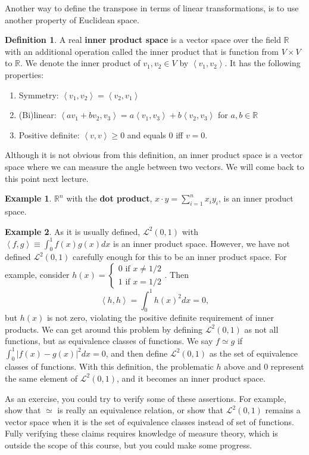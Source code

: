 \documentclass[12pt,reqno]{amsart}
\def\R{\mathbb{R}}
\newcommand{\iprod}[2]{\left\langle {#1} , {#2} \right\rangle}
\theoremstyle{definition}
\newtheorem{definition}{Definition}[section]
\newtheorem{example}{Example}[section]
\begin{document}
Another way to define the transpose in terms of linear
transformations, is to use another property of Euclidean
space. 
\begin{definition}
  A real \textbf{inner product space} is a vector space over the field
  $\R$ with an additional operation called the inner product that is
  function from $V \times V$ to $\mathbb{R}$. We denote the inner
  product of $v_1, v_2 \in V$ by $\iprod{v_1}{v_2}$. It has the
  following properties:
  \begin{enumerate}
  \item Symmetry: $\iprod{v_1}{v_2} = \iprod{v_2}{v_1}$
  \item (Bi)linear: $\iprod{a v_1 + b v_2}{v_3} = a \iprod{v_1}{v_3} + b
    \iprod{v_2}{v_3}$ for $a, b \in \R$
  \item Positive definite: $\iprod{v}{v} \geq 0$ and equals $0$ iff
    $v=0$. 
  \end{enumerate}  
\end{definition}
Although it is not obvious from this definition, an inner product
space is a vector space where we can measure the angle between two
vectors. We will come back to this point next lecture.
\begin{example}
  $\R^n$ with the \textbf{dot product}, $x \cdot y = \sum_{i=1}^n x_i
  y_i$, is an inner product space. 
\end{example}

\begin{example}
  As it is usually defined, $\mathcal{L}^2(0,1)$ with $\iprod{f}{g}
  \equiv \int_0^1 f(x) g(x) dx$ is an inner product space. However, we
  have not defined $\mathcal{L}^2(0,1)$ carefully enough for this to
  be an inner product space. For example, consider $h(x)
  = \begin{cases} 0 \text{ if } x \neq 1/2 \\
    1 \text{ if } x = 1/2
  \end{cases}$. Then 
  \[ 
  \iprod{h}{h} = \int_0^1 h(x)^2 dx = 0,
  \]
  but $h(x)$ is not zero, violating the positive definite requirement
  of inner products. We can get around this problem by defining
  $\mathcal{L}^2(0,1)$ as not all functions, but as equivalence
  classes of functions. We say $f \simeq g$ if $\int_0^1 |f(x) -
  g(x)|^2 dx = 0$, and then define $\mathcal{L}^2(0,1)$ as the set of
  equivalence classes of functions. With this definition, the
  problematic $h$ above and $0$ represent the same element of
  $\mathcal{L}^2(0,1)$, and it becomes an inner product space. 

  As an exercise, you could try to verify some of these
  assertions. For example, show that $\simeq$ is really an equivalence
  relation, or show that $\mathcal{L}^2(0,1)$ remains a vector space
  when it is the set of equivalence classes instead of set of
  functions. Fully verifying these claims requires knowledge of
  measure theory, which is outside the scope of this course, but you
  could make some progress.
\end{example}
\end{document}
